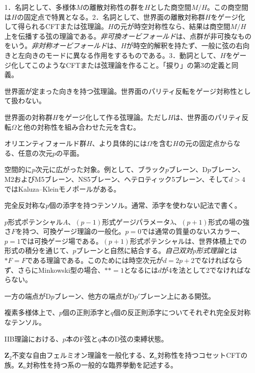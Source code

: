 {1．名詞として、多様体$M$の離散対称性の群を$H$とした商空間$M/H$。この商空間は$H$の固定点で特異となる。2．名詞として、世界面の離散対称群$H$をゲージ化して得られるCFTまたは弦理論。$H$の元が時空対称性なら、結果は商空間$M/H$上を伝播する弦の理論である。\emph{非可換オービフォールド}は、点群が非可換なものをいう。\emph{非対称オービフォールド}は、$H$が時空的解釈を持たず、一般に弦の右向きと左向きのモードに異なる作用をするものである。3．動詞として、$H$をゲージ化してこのようなCFTまたは弦理論を作ること。「捩り」の第3の定義と同義。}

{世界面が定まった向きを持つ弦理論。世界面のパリティ反転をゲージ対称性として扱わない。}

{世界面の対称群$H$をゲージ化して作る弦理論。ただし$H$は、世界面のパリティ反転$\Omega$と他の対称性を組み合わせた元を含む。}

{オリエンティフォールド群$H$、より具体的には$\Omega$を含む$H$の元の固定点からなる、任意の次元$p$の平面。}

{空間的に$p$次元に広がった対象。例として、ブラック$p$ブレーン、D$p$ブレーン、M2およびM5ブレーン、NS5ブレーン、ヘテロティック5ブレーン、そして$d>4$ではKaluza--Kleinモノポールがある。}

{完全反対称な$p$個の添字を持つテンソル。通常、添字を使わない記法で書く。}

{$p$形式ポテンシャル$A$、$(p-1)$形式ゲージパラメータ$\lambda$、$(p+1)$形式の場の強さ$F$を持つ、可換ゲージ理論の一般化。$p=0$では通常の質量のないスカラー、$p=1$では可換ゲージ場である。$(p+1)$形式ポテンシャルは、世界体積上での形式の積分を通じて、$p$ブレーンと自然に結合する。\emph{自己双対$p$形式理論}とは$*F=F$である理論である。このためには時空次元が$d=2p+2$でなければならず、さらにMinkowski型の場合、$**=1$となるには$d$が4を法として2でなければならない。}

{一方の端点がD$p$ブレーン、他方の端点がD$p'$ブレーン上にある開弦。}

{複素多様体上で、$p$個の正則添字と$q$個の反正則添字についてそれぞれ完全反対称なテンソル。}

{IIB理論における、$p$本のF弦と$q$本のD弦の束縛状態。}

{$\mathbf Z_2$不変な自由フェルミオン理論を一般化する、$\mathbf Z_n$対称性を持つコセットCFTの族。$\mathbf Z_n$対称性を持つ系の一般的な臨界挙動を記述する。}

